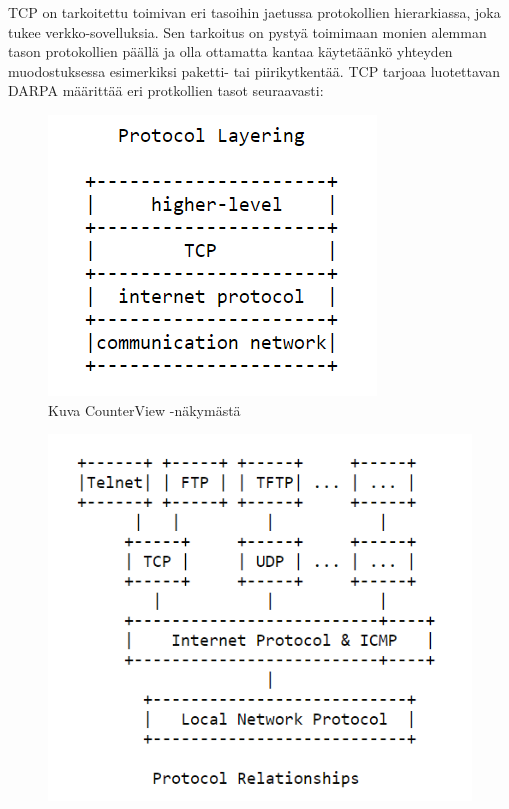 \documentclass[utf8]{gradu3}
\begin{document}
TCP on tarkoitettu toimivan eri tasoihin jaetussa protokollien hierarkiassa, joka tukee verkko-sovelluksia. Sen tarkoitus on pystyä toimimaan monien alemman tason protokollien päällä ja olla ottamatta kantaa käytetäänkö yhteyden muodostuksessa esimerkiksi paketti- tai piirikytkentää. TCP tarjoaa luotettavan DARPA määrittää eri protkollien tasot seuraavasti:


\begin{figure}[h]
\centering
\includegraphics[scale=0.85]{protocol_layering.PNG}
\caption{Kuva CounterView -näkymästä \cite{tcp}}
\end{figure}

\begin{figure}[h]
\centering
\includegraphics[scale=0.85]{internet_protocol.PNG}
\caption{ \cite{internet_protocol}}
\end{figure}
\end{document}
